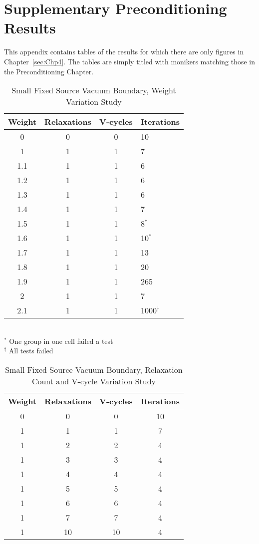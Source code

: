 
\chapter{Supplementary Preconditioning Results}
\label{sec:AppendixD}
This appendix contains tables of the results for which there are only figures in Chapter~\ref{sec:Chp4}. The tables are simply titled with monikers matching those in the Preconditioning Chapter. 

\begin{table}[!h]
\caption{Small Fixed Source Vacuum Boundary, Weight Variation Study}
\begin{center}
\begin{tabular}{c c c l}
\hline
Weight & Relaxations & V-cycles & Iterations \\[0.5ex]
\hline
0    & 0 & 0 & 10 \\
1    & 1 & 1 & 7 \\
1.1 & 1 & 1 & 6 \\
1.2 & 1 & 1 & 6 \\
1.3 & 1 & 1 & 6 \\
1.4 & 1 & 1 & 7 \\
1.5 & 1 & 1 & 8$^{*}$ \\
1.6 & 1 & 1 & 10$^{*}$ \\
1.7 & 1 & 1 & 13 \\
1.8 & 1 & 1 & 20 \\
1.9 & 1 & 1 & 265 \\
2    & 1 & 1 & 7 \\
2.1 & 1 & 1 & 1000$^{\dagger}$ \\
\hline 
\end{tabular} \\
$^{*}$ One group in one cell failed a test \\
$^{\dagger}$ All tests failed
\end{center}
\label{table:FxdSrcTstVacWeight}
\end{table}

\begin{table}[!h]
\caption{Small Fixed Source Vacuum Boundary, Relaxation Count and V-cycle Variation Study}
\begin{center}
\begin{tabular}{c c c c}
\hline
Weight & Relaxations & V-cycles & Iterations \\[0.5ex]
\hline
0  & 0 & 0 & 10 \\
1 & 1 & 1 & 7 \\
1 & 2 & 2 & 4 \\
1 & 3 & 3 & 4 \\
1 & 4 & 4 & 4 \\
1 & 5 & 5 & 4 \\
1 & 6 & 6 & 4 \\
1 & 7 & 7 & 4 \\
1 & 10 & 10 & 4 \\
\hline 
\end{tabular}
\end{center}
\label{table:FxdSrcTstVacRV}
\end{table}

